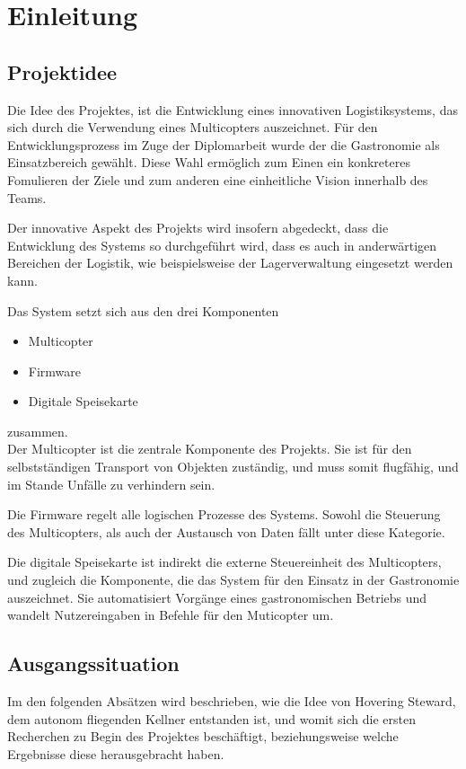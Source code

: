 \chapter{Einleitung}
\renewcommand{\kapitelautor}{Autor: Markus Kaiser}

\section{Projektidee}
Die Idee des Projektes, ist die Entwicklung eines innovativen Logistiksystems, das sich durch die Verwendung eines Multicopters auszeichnet.
Für den Entwicklungsprozess im Zuge der Diplomarbeit wurde der die Gastronomie als Einsatzbereich gewählt. Diese Wahl ermöglich zum Einen
ein konkreteres Fomulieren der Ziele und zum anderen eine einheitliche Vision innerhalb des Teams.

Der innovative Aspekt des Projekts wird insofern abgedeckt, dass die Entwicklung des Systems so durchgeführt wird,
dass es auch in anderwärtigen Bereichen der Logistik, wie beispielsweise der Lagerverwaltung eingesetzt werden kann.

Das System setzt sich aus den drei Komponenten\\
\begin{itemize}
  \item Multicopter
  \item Firmware
  \item Digitale Speisekarte
\end{itemize}

zusammen.\\

Der Multicopter ist die zentrale Komponente des Projekts. Sie ist für den selbstständigen Transport von Objekten zuständig,
und muss somit flugfähig, und im Stande Unfälle zu verhindern sein.

Die Firmware regelt alle logischen Prozesse des Systems. Sowohl die Steuerung des Multicopters, als auch der
Austausch von Daten fällt unter diese Kategorie.

Die digitale Speisekarte ist indirekt die externe Steuereinheit des Multicopters, und zugleich die Komponente,
die das System für den Einsatz in der Gastronomie auszeichnet. Sie automatisiert Vorgänge eines gastronomischen
Betriebs und wandelt Nutzereingaben in Befehle für den Muticopter um.

\section{Ausgangssituation}
  Im den folgenden Absätzen wird beschrieben, wie die Idee von Hovering Steward, dem autonom fliegenden Kellner
  entstanden ist, und womit sich die ersten Recherchen zu Begin des Projektes beschäftigt, beziehungsweise
  welche Ergebnisse diese herausgebracht haben.


